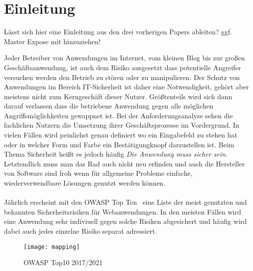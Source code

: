 \chapter{Einleitung}


\begin{neu}
  Lässt sich hier eine Einleitung aus den drei vorherigen Papers ableiten? ggf. Master Expose mit hinzuziehen!
\end{neu}

Jeder Betreiber von Anwendungen im Internet, vom kleinen Blog bis zur großen Geschäftsanwendung, ist auch dem Risiko ausgesetzt dass potentielle Angreifer versuchen werden den Betrieb zu stören oder zu manipulieren. Der Schutz von Anwendungen im Bereich IT-Sicherheit ist daher eine Notwendigkeit, gehört aber meistens nicht zum Kerngeschäft dieser Nutzer. Größtenteils wird sich dann darauf verlassen dass die betriebene Anwendung gegen alle möglichen Angriffsmöglichkeiten gewappnet ist. Bei der Anforderungsanalyse sehen die fachlichen Nutzern die Umsetzung ihrer Geschäftsprozesse im Vordergrund. In vielen Fällen wird peinlichst genau definiert wo ein Eingabefeld zu stehen hat oder in welcher Form und Farbe ein Bestätigungknopf darzustellen ist. Beim Thema Sicherheit heißt es jedoch häufig \glqq\emph{Die Anwendung muss sicher sein.}\grqq \\
Letztendlich muss man das Rad auch nicht neu erfinden und auch die Hersteller von Software sind froh wenn für allgemeine Probleme einfache, wiederverwendbare Lösungen genutzt werden können. \\\\

Jährlich erscheint mit den OWASP Top Ten~\cite{owasp10}  eine Liste der meist genutzten und bekannten Sicherheitsrisiken für Webanwendungen. In den meisten Fällen wird eine Anwendung sehr indiviuell gegen solche Risiken abgesichert und häufig wird dabei auch jedes einzelne Risiko separat adressiert. \\


\begin{figure}[bht]
  \begin{center}
    \texttt{[image: mapping]}
    \caption{OWASP Top10 2017/2021~\cite{owasp10}}
    \label{fig.topten}
  \end{center}
\end{figure}

